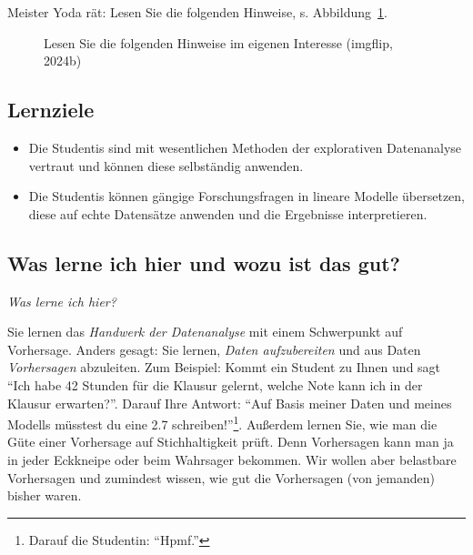 \documentclass[
  letterpaper,
]{scrbook}
\theoremstyle{definition}
\theoremstyle{definition}
\theoremstyle{definition}
\theoremstyle{remark}
\begin{document}
Meister Yoda rät: Lesen Sie die folgenden Hinweise, s.
Abbildung~\ref{fig-yoda}.

\begin{figure}


\caption{\label{fig-yoda}Lesen Sie die folgenden Hinweise im eigenen
Interesse (imgflip, 2024b)}

\end{figure}%

\subsection{Lernziele}\label{lernziele}

\begin{itemize}
\item
  Die Studentis sind mit wesentlichen Methoden der explorativen
  Datenanalyse vertraut und können diese selbständig anwenden.
\item
  Die Studentis können gängige Forschungsfragen in lineare Modelle
  übersetzen, diese auf echte Datensätze anwenden und die Ergebnisse
  interpretieren.
\end{itemize}

\subsection{Was lerne ich hier und wozu ist das
gut?}\label{was-lerne-ich-hier-und-wozu-ist-das-gut}

\emph{Was lerne ich hier?}

Sie lernen das \emph{Handwerk der Datenanalyse} mit einem Schwerpunkt
auf Vorhersage. Anders gesagt: Sie lernen, \emph{Daten aufzubereiten}
und aus Daten \emph{Vorhersagen} abzuleiten. Zum Beispiel: Kommt ein
Student zu Ihnen und sagt ``Ich habe 42 Stunden für die Klausur gelernt,
welche Note kann ich in der Klausur erwarten?''. Darauf Ihre Antwort:
``Auf Basis meiner Daten und meines Modells müsstest du eine 2.7
schreiben!''\footnote{Darauf die Studentin: ``Hpmf.''}. Außerdem lernen
Sie, wie man die Güte einer Vorhersage auf Stichhaltigkeit prüft. Denn
Vorhersagen kann man ja in jeder Eckkneipe oder beim Wahrsager bekommen.
Wir wollen aber belastbare Vorhersagen und zumindest wissen, wie gut die
Vorhersagen (von jemanden) bisher waren.
\end{document}
